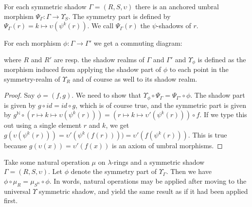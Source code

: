 \begin{propdef}
  For each symmetric shadow $\Gamma = (R, S, \upsilon)$ there is an anchored umbral morphism $\Psi_{\Gamma} : \Gamma \to \Upsilon_S$. The symmetry part is defined by $\Psi_{\Gamma}(r) = k \mapsto \upsilon(\psi^k(r))$. We call $\Psi_{\Gamma}(r)$ the $\psi$-shadows of $r$.
\end{propdef}

\begin{propdef} \label{propdef:upsilonUniversalDiagram}
  For each morphism $\phi : \Gamma \to \Gamma'$ we get a commuting diagram:
  \begin{center}
  \end{center}
  where $R$ and $R'$ are resp. the shadow realms of $\Gamma$ and $\Gamma'$ and $\Upsilon_{\phi}$ is defined as the morphism induced from applying the shadow part of $\phi$ to each point in the symmetry-realm of $\Upsilon_R$ and of course as well to its shadow realm.
\end{propdef}

\begin{proof}
  Say $\phi = (f, g)$. We need to show that $\Upsilon_{\phi} \circ \Psi_\Gamma = \Psi_{\Gamma'} \circ \phi$. The shadow part is given by $g \circ id = id \circ g$, which is of course true, and the symmetric part is given by $g^{\mathbb{N}} \circ (r \mapsto k \mapsto \upsilon(\psi^k(r))) = (r \mapsto k \mapsto \upsilon'(\psi^k(r))) \circ f$. If we type this out using a single element $r$ and $k$, we get $g(\upsilon(\psi^k(r))) = \upsilon'(\psi^k(f(r)))) = \upsilon'(f(\psi^k(r)))$. This is true because $g(\upsilon(x)) = \upsilon'(f(x))$ is an axiom of umbral morphisms. \qedhere
\end{proof}

\begin{proposition} \label{prop:naturalCommutativity}
  Take some natural operation $\mu$ on $\lambda$-rings and a symmetric shadow $\Gamma = (R, S, \upsilon)$. Let $\phi$ denote the symmetry part of $\Upsilon_\Gamma$. Then we have $\phi \circ \mu_R = \mu_{S^{\mathbb{N}}} \circ \phi$. In words, natural operations may be applied after moving to the universal $\Upsilon$ symmetric shadow, and yield the same result as if it had been applied first.
\end{proposition}

